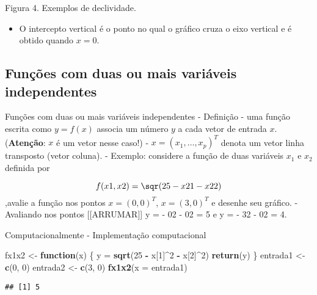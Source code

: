 \documentclass[
]{article}
\newenvironment{Shaded}{\begin{snugshade}}{\end{snugshade}}
\newcommand{\AttributeTok}[1]{\textcolor[rgb]{0.13,0.29,0.53}{#1}}
\newcommand{\ControlFlowTok}[1]{\textcolor[rgb]{0.13,0.29,0.53}{\textbf{#1}}}
\newcommand{\DecValTok}[1]{\textcolor[rgb]{0.00,0.00,0.81}{#1}}
\newcommand{\FunctionTok}[1]{\textcolor[rgb]{0.13,0.29,0.53}{\textbf{#1}}}
\newcommand{\NormalTok}[1]{#1}
\newcommand{\OtherTok}[1]{\textcolor[rgb]{0.56,0.35,0.01}{#1}}
\newcommand{\SpecialCharTok}[1]{\textcolor[rgb]{0.81,0.36,0.00}{\textbf{#1}}}
\providecommand{\tightlist}{%
  \setlength{\itemsep}{0pt}\setlength{\parskip}{0pt}}
\begin{document}
Figura 4. Exemplos de declividade.

\begin{itemize}
\tightlist
\item
  O intercepto vertical é o ponto no qual o gráfico cruza o eixo
  vertical e é obtido quando \(x = 0\).
\end{itemize}

\hypertarget{funuxe7uxf5es-com-duas-ou-mais-variuxe1veis-independentes}{%
\subsection{Funções com duas ou mais variáveis
independentes}\label{funuxe7uxf5es-com-duas-ou-mais-variuxe1veis-independentes}}

Funções com duas ou mais variáveis independentes - Definição - uma
função escrita como \(y = f(x)\) associa um número \(y\) a cada vetor de
entrada \(x\). (\textbf{Atenção}: \(x\) é um vetor nesse caso!) -
\(x = (x_1, … , x_p)^T\) denota um vetor linha transposto (vetor
coluna). - Exemplo: considere a função de duas variáveis \(x_1\) e
\(x_2\) definida por

\[ f(x1, x2) = \sqr(25 - x21- x22)\] ,avalie a função nos pontos
\(x = (0, 0)^T\), \(x = (3, 0)^T\) e desenhe seu gráfico. - Avaliando
nos pontos {[}{[}ARRUMAR{]}{]} y =  - 02 - 02 = 5 e y =  - 32 - 02 = 4.

Computacionalmente - Implementação computacional

\begin{Shaded}
\begin{Highlighting}[]
\NormalTok{fx1x2 }\OtherTok{\textless{}{-}} \ControlFlowTok{function}\NormalTok{(x) \{}
\NormalTok{y }\OtherTok{=} \FunctionTok{sqrt}\NormalTok{(}\DecValTok{25} \SpecialCharTok{{-}}\NormalTok{ x[}\DecValTok{1}\NormalTok{]}\SpecialCharTok{\^{}}\DecValTok{2} \SpecialCharTok{{-}}\NormalTok{ x[}\DecValTok{2}\NormalTok{]}\SpecialCharTok{\^{}}\DecValTok{2}\NormalTok{)}
\FunctionTok{return}\NormalTok{(y)}
\NormalTok{\}}
\NormalTok{entrada1 }\OtherTok{\textless{}{-}} \FunctionTok{c}\NormalTok{(}\DecValTok{0}\NormalTok{, }\DecValTok{0}\NormalTok{)}
\NormalTok{entrada2 }\OtherTok{\textless{}{-}} \FunctionTok{c}\NormalTok{(}\DecValTok{3}\NormalTok{, }\DecValTok{0}\NormalTok{)}
\FunctionTok{fx1x2}\NormalTok{(}\AttributeTok{x =}\NormalTok{ entrada1)}
\end{Highlighting}
\end{Shaded}

\begin{verbatim}
## [1] 5
\end{verbatim}
\end{document}
